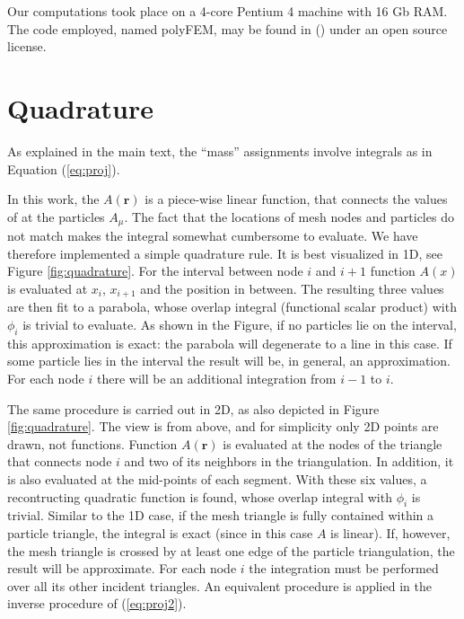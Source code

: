 \documentclass{ws-ijcm}
\newcommand{\bfr}{\mathbf{r}}
\begin{document}
Our computations took place on a 4-core Pentium 4 machine with 16 Gb
RAM. The code employed, named polyFEM, may be found in
(\cite{polyFEM}) under an open source license.



\section{Quadrature}
\label{sec:quadrature}

As explained in the main text, the ``mass'' assignments involve
integrals as in Equation (\ref{eq:proj}).

In this work, the $A(\bfr)$ is a piece-wise linear function, that
connects the values of at the particles $A_\mu$. The fact that the
locations of mesh nodes and particles do not match makes the integral
somewhat cumbersome to evaluate.  We have therefore implemented a
simple quadrature rule. It is best visualized in 1D, see Figure
\ref{fig:quadrature}. For the interval between node $i$ and $i+1$
function $A(x)$ is evaluated at $x_i$, $x_{i+1}$ and the position in
between. The resulting three values are then fit to a parabola, whose
overlap integral (functional scalar product) with $\phi_i$ is trivial
to evaluate. As shown in the Figure, if no particles lie on the
interval, this approximation is exact: the parabola will degenerate
to a line in this case. If some particle lies in the interval the
result will be, in general, an approximation.  For each node $i$ there
will be an additional integration from $i-1$ to $i$.

The same procedure is carried out in 2D, as also depicted in Figure
\ref{fig:quadrature}. The view is from above, and for simplicity only
2D points are drawn, not functions. Function $A(\bfr)$ is evaluated at
the nodes of the triangle that connects node $i$ and two of its
neighbors in the triangulation. In addition, it is also evaluated at
the mid-points of each segment. With these six values, a recontructing
quadratic function is found, whose overlap integral with $\phi_i$ is
trivial. Similar to the 1D case, if the mesh triangle is fully
contained within a particle triangle, the integral is exact (since in
this case $A$ is linear). If, however, the mesh triangle is crossed by
at least one edge of the particle triangulation, the result will be
approximate.  For each node $i$ the integration must be performed over
all its other incident triangles.  An equivalent procedure is applied
in the inverse procedure of (\ref{eq:proj2}).
\end{document}
